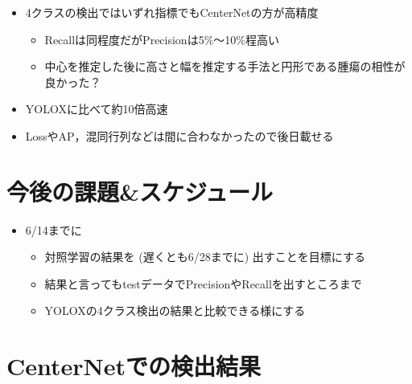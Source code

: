 \documentclass[a4j]{ujarticle}
\begin{document}
\begin{itemize}
\begin{itemize}
                \item 4クラスの検出ではいずれ指標でもCenterNet\cite{centernet}の方が高精度
                \begin{itemize}
                    \item Recallは同程度だがPrecisionは5\%〜10\%程高い
                    \item 中心を推定した後に高さと幅を推定する手法と円形である腫瘍の相性が良かった？
                \end{itemize}
                \item YOLOXに比べて約10倍高速
                \item LossやAP，混同行列などは間に合わなかったので後日載せる
            \end{itemize}

        \end{itemize}

\clearpage

    \section{今後の課題\&スケジュール}
        \begin{itemize}
            \item 6/14までに
            \begin{itemize}
                \item 対照学習の結果を (遅くとも6/28までに) 出すことを目標にする
                \item 結果と言ってもtestデータでPrecisionやRecallを出すところまで
                \item YOLOXの4クラス検出の結果と比較できる様にする
            \end{itemize}
        \end{itemize}

    \appendix
	\def\thesection{付録\Alph{section}}
	\section{CenterNetでの検出結果}
\end{document}

